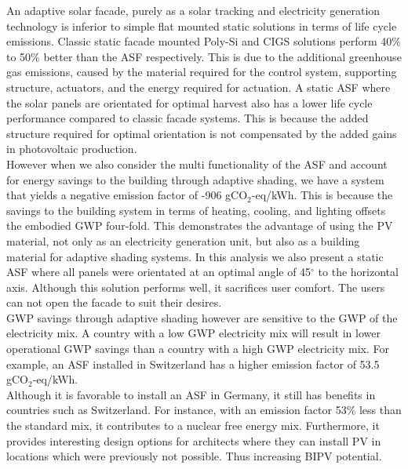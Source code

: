 
An adaptive solar facade, purely as a solar tracking and electricity generation technology is inferior to simple flat mounted static solutions in terms of life cycle emissions.  Classic static facade mounted Poly-Si and CIGS solutions perform 40\% to 50\% better than the ASF respectively. This is due to the additional greenhouse gas emissions, caused by the material required for the control system, supporting structure, actuators, and the energy required for actuation. A static ASF where the solar panels are orientated for optimal harvest also has a lower life cycle performance compared to classic facade systems. This is because the added structure required for optimal orientation is not compensated by the added gains in photovoltaic production.\\

However when we also consider the multi functionality of the ASF and account for energy savings to the building through adaptive shading, we have a system that yields a negative emission factor of  -906 gCO$_{2}$-eq/kWh. This is because the savings to the building system in terms of heating, cooling, and lighting offsets the embodied GWP four-fold. This demonstrates the advantage of using the PV material, not only as an electricity generation unit, but also as a building material for adaptive shading systems. In this analysis we also present a static ASF where all panels were orientated at an optimal angle of 45$^{\circ}$ to the horizontal axis. Although this solution performs well, it sacrifices user comfort. The users can not open the facade to suit their desires.\\



GWP savings through adaptive shading however are sensitive to the GWP of the electricity mix. A country with a low GWP electricity mix will result in lower operational GWP savings than a country with a high GWP electricity mix. For example, an ASF installed in Switzerland has a higher emission factor of 53.5 gCO$_{2}$-eq/kWh.\\

Although it is favorable to install an ASF in Germany, it still has benefits in countries such as Switzerland. For instance, with an emission factor 53\% less than the standard mix, it contributes to a nuclear free energy mix. Furthermore, it provides interesting design options for architects where they can install PV in locations which were previously not possible. Thus increasing BIPV potential.\\


